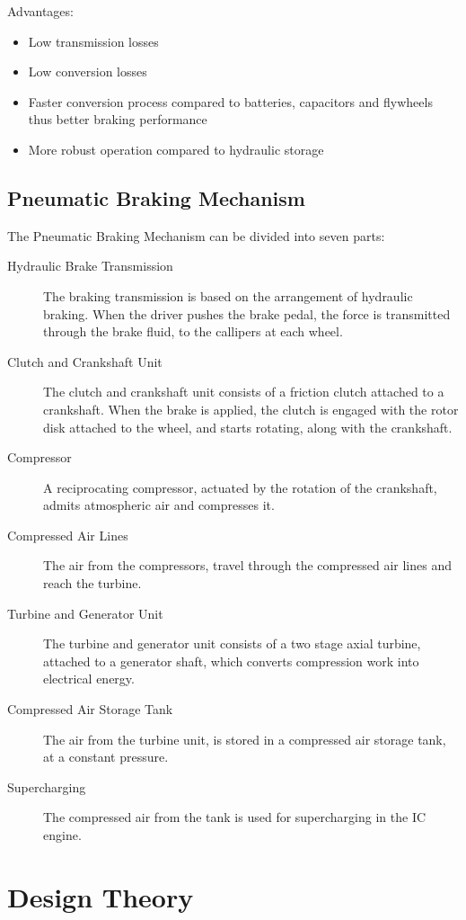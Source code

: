 \documentclass[12pt,a4paper]{article}
\begin{document}
		Advantages:

		\begin{itemize}
			\item Low transmission losses
			\item Low conversion losses
			\item Faster conversion process compared to batteries, capacitors and flywheels thus better braking performance
			\item More robust operation compared to hydraulic storage
		\end{itemize}

	\subsection{Pneumatic Braking Mechanism}
		The Pneumatic Braking Mechanism can be divided into seven parts:

		\begin{description}
			\item [Hydraulic Brake Transmission] The braking transmission is based on the arrangement of hydraulic braking. When the driver pushes the brake pedal, the force is transmitted through the brake fluid, to the callipers at each wheel.
			\item [Clutch and Crankshaft Unit] The clutch and crankshaft unit consists of a friction clutch attached to a crankshaft. When the brake is applied, the clutch is engaged with the rotor disk attached to the wheel, and starts rotating, along with the crankshaft.
			\item [Compressor] A reciprocating compressor, actuated by the rotation of the crankshaft, admits atmospheric air and compresses it.
			\item [Compressed Air Lines] The air from the compressors, travel through the compressed air lines and reach the turbine.
			\item [Turbine and Generator Unit] The turbine and generator unit consists of a two stage axial turbine, attached to a generator shaft, which converts compression work into electrical energy.
			\item [Compressed Air Storage Tank] The air from the turbine unit, is stored in a compressed air storage tank, at a constant pressure.
			\item [Supercharging] The compressed air from the tank is used for supercharging in the IC engine.
		\end{description}

\section{Design Theory}
\end{document}
